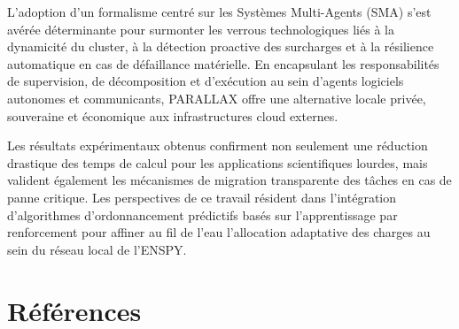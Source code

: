 \documentclass[12pt,a4paper]{report}
\begin{document}
L'adoption d'un formalisme centré sur les Systèmes Multi-Agents (SMA) s'est avérée déterminante pour surmonter les verrous technologiques liés à la dynamicité du cluster, à la détection proactive des surcharges et à la résilience automatique en cas de défaillance matérielle. En encapsulant les responsabilités de supervision, de décomposition et d'exécution au sein d'agents logiciels autonomes et communicants, PARALLAX offre une alternative locale privée, souveraine et économique aux infrastructures cloud externes.

Les résultats expérimentaux obtenus confirment non seulement une réduction drastique des temps de calcul pour les applications scientifiques lourdes, mais valident également les mécanismes de migration transparente des tâches en cas de panne critique. Les perspectives de ce travail résident dans l'intégration d'algorithmes d'ordonnancement prédictifs basés sur l'apprentissage par renforcement pour affiner au fil de l'eau l'allocation adaptative des charges au sein du réseau local de l'ENSPY.

\section*{Références}
\end{document}
